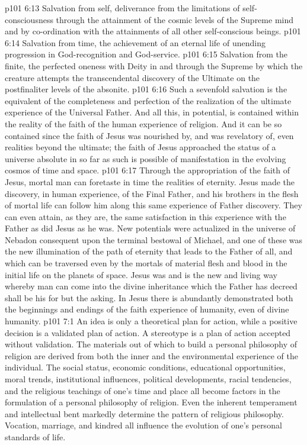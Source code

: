 \vs p101 6:13 \bibnobreakspace Salvation from self, deliverance from the limitations of self\hyp{}consciousness through the attainment of the cosmic levels of the Supreme mind and by co\hyp{}ordination with the attainments of all other self\hyp{}conscious beings.
\vs p101 6:14 \bibnobreakspace Salvation from time, the achievement of an eternal life of unending progression in God\hyp{}recognition and God\hyp{}service.
\vs p101 6:15 \bibnobreakspace Salvation from the finite, the perfected oneness with Deity in and through the Supreme by which the creature attempts the transcendental discovery of the Ultimate on the postfinaliter levels of the absonite.
\vs p101 6:16 \pc Such a sevenfold salvation is the equivalent of the completeness and perfection of the realization of the ultimate experience of the Universal Father. And all this, in potential, is contained within the reality of the faith of the human experience of religion. And it can be so contained since the faith of Jesus was nourished by, and was revelatory of, even realities beyond the ultimate; the faith of Jesus approached the status of a universe absolute in so far as such is possible of manifestation in the evolving cosmos of time and space.
\vs p101 6:17 Through the appropriation of the faith of Jesus, mortal man can foretaste in time the realities of eternity. Jesus made the discovery, in human experience, of the Final Father, and his brothers in the flesh of mortal life can follow him along this same experience of Father discovery. They can even attain, as they are, the same satisfaction in this experience with the Father as did Jesus as he was. New potentials were actualized in the universe of Nebadon consequent upon the terminal bestowal of Michael, and one of these was the new illumination of the path of eternity that leads to the Father of all, and which can be traversed even by the mortals of material flesh and blood in the initial life on the planets of space. Jesus was and is the new and living way whereby man can come into the divine inheritance which the Father has decreed shall be his for but the asking. In Jesus there is abundantly demonstrated both the beginnings and endings of the faith experience of humanity, even of divine humanity.
\vs p101 7:1 An idea is only a theoretical plan for action, while a positive decision is a validated plan of action. A stereotype is a plan of action accepted without validation. The materials out of which to build a personal philosophy of religion are derived from both the inner and the environmental experience of the individual. The social status, economic conditions, educational opportunities, moral trends, institutional influences, political developments, racial tendencies, and the religious teachings of one’s time and place all become factors in the formulation of a personal philosophy of religion. Even the inherent temperament and intellectual bent markedly determine the pattern of religious philosophy. Vocation, marriage, and kindred all influence the evolution of one’s personal standards of life.
